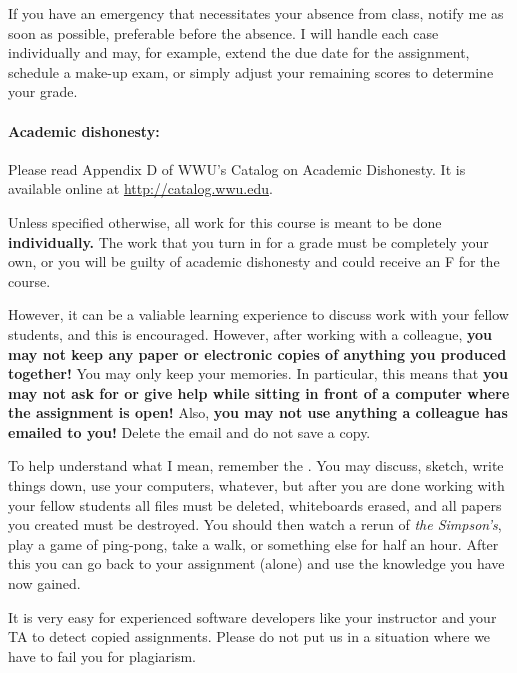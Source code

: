 \documentclass{article}
\begin{document}
  If you have an emergency that necessitates your absence from class,
  notify me as soon as possible, preferable before the absence.  I
  will handle each case individually and may, for example, extend the
  due date for the assignment, schedule a make-up exam, or simply
  adjust your remaining scores to determine your grade.

\paragraph{Academic dishonesty:} Please read Appendix D of WWU's Catalog on
  Academic Dishonesty.  It is available online at
  \url{http://catalog.wwu.edu}.

  Unless specified otherwise, all work for this course is meant to
  be done {\bf individually.}  The work that you turn in for a grade
  must be completely your own, or you will be guilty of academic
  dishonesty and could receive an F for the course.

  However, it can be a valiable learning experience to discuss
  work with your fellow students, and this is encouraged.
  However, after working with a colleague, {\bf you may not keep any
    paper or electronic copies of anything you produced together!}
  You may only keep your memories.  In particular, this means that
  {\bf you may not ask for or give help while sitting in front of a
    computer where the assignment is open!}  Also, {\bf you may not
    use anything a colleague has emailed to you!}  Delete the email
  and do not save a copy.

  To help understand what I mean, remember the .  You may discuss, sketch, write things down, use
  your computers, whatever, but after you are done working with your
  fellow students all files must be deleted, whiteboards erased, and
  all papers you created must be destroyed.  You should then watch a
  rerun of {\em the Simpson's}, play a game of ping-pong, take a walk,
  or something else for half an hour. After this you can go back to
  your assignment (alone) and use the knowledge you have now gained.

  It is very easy for experienced software developers like your
  instructor and your TA to detect copied assignments.  Please do not
  put us in a situation where we have to fail you for plagiarism.
\end{document}
